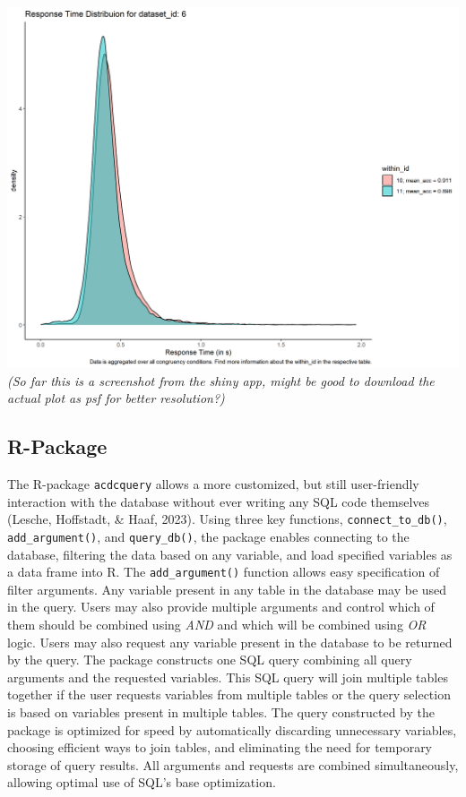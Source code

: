 \documentclass[
  man,floatsintext]{apa6}
\begin{document}
\includegraphics{images/example_descriptive_plot.png}
\emph{ (So far this is a screenshot from the shiny app, might be good to download the actual plot as psf for better resolution?)}

\hypertarget{r-package}{%
\subsection{R-Package}\label{r-package}}

The R-package \texttt{acdcquery} allows a more customized, but still user-friendly interaction with the database without ever writing any SQL code themselves (Lesche, Hoffstadt, \& Haaf, 2023). Using three key functions, \texttt{connect\_to\_db()}, \texttt{add\_argument()}, and \texttt{query\_db()}, the package enables connecting to the database, filtering the data based on any variable, and load specified variables as a data frame into R. The \texttt{add\_argument()} function allows easy specification of filter arguments. Any variable present in any table in the database may be used in the query. Users may also provide multiple arguments and control which of them should be combined using \emph{AND} and which will be combined using \emph{OR} logic. Users may also request any variable present in the database to be returned by the query. The package constructs one SQL query combining all query arguments and the requested variables. This SQL query will join multiple tables together if the user requests variables from multiple tables or the query selection is based on variables present in multiple tables. The query constructed by the package is optimized for speed by automatically discarding unnecessary variables, choosing efficient ways to join tables, and eliminating the need for temporary storage of query results. All arguments and requests are combined simultaneously, allowing optimal use of SQL's base optimization.
\end{document}
